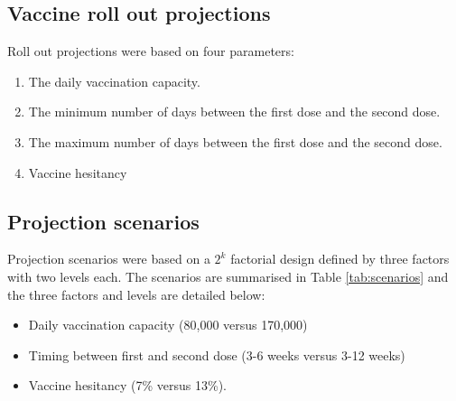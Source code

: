 \documentclass{article}
\begin{document}
\hypertarget{vaccine-roll-out-projections}{%
\subsection{Vaccine roll out
projections}\label{vaccine-roll-out-projections}}

Roll out projections were based on four parameters:

\begin{enumerate}
\def\labelenumi{\arabic{enumi}.}
\tightlist
\item
  The daily vaccination capacity.
\item
  The minimum number of days between the first dose and the second dose.
\item
  The maximum number of days between the first dose and the second dose.
\item
  Vaccine hesitancy
\end{enumerate}

\hypertarget{projection-scenarios}{%
\subsection{Projection scenarios}\label{projection-scenarios}}

Projection scenarios were based on a \(2^k\) factorial design defined by
three factors with two levels each. The scenarios are summarised in
Table \ref{tab:scenarios} and the three factors and levels are detailed
below:

\begin{itemize}
\item
  Daily vaccination capacity (80,000 versus 170,000)
\item
  Timing between first and second dose (3-6 weeks versus 3-12 weeks)
\item
  Vaccine hesitancy (7\% versus 13\%).
\end{itemize}
\end{document}
